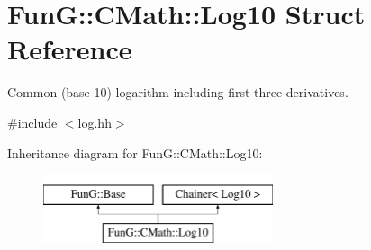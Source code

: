 \hypertarget{structFunG_1_1CMath_1_1Log10}{\section{Fun\-G\-:\-:C\-Math\-:\-:Log10 Struct Reference}
\label{structFunG_1_1CMath_1_1Log10}
}


Common (base 10) logarithm including first three derivatives.  




{\ttfamily \#include $<$log.\-hh$>$}

Inheritance diagram for Fun\-G\-:\-:C\-Math\-:\-:Log10\-:\begin{figure}[H]
\begin{center}
\leavevmode
\includegraphics[height=2.000000cm]{structFunG_1_1CMath_1_1Log10}
\end{center}
\end{figure}
